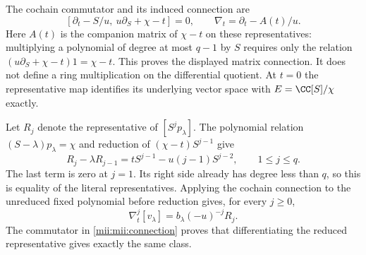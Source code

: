 \documentclass[11pt,a4paper]{article}
\begin{document}
The cochain commutator and its induced connection are
\begin{equation}\tag{MII16}\label{mii:mii:connection}
 [\partial_t-S/u,\ u\partial_S+\chi-t]=0,
 \qquad\nabla_t=\partial_t-A(t)/u.
\end{equation}
Here $A(t)$ is the companion matrix of $\chi-t$ on these
representatives: multiplying a polynomial of degree at most $q-1$
by $S$ requires only the relation
$(u\partial_S+\chi-t)1=\chi-t$. This proves the displayed matrix
connection. It does not define a ring multiplication on the
differential quotient. At $t=0$ the representative map identifies
its underlying vector space with $E=\CC[S]/\chi$ exactly.

Let $R_j$ denote the representative of $[S^j p_\lambda]$. The
polynomial relation $(S-\lambda)p_\lambda=\chi$ and reduction of
$(\chi-t)S^{j-1}$ give
\begin{equation}\tag{MII17}\label{mii:mii:recurrence}
 R_j-\lambda R_{j-1}
       =t S^{j-1}-u(j-1)S^{j-2},\qquad 1\le j\le q.
\end{equation}
The last term is zero at $j=1$. Its right side already has degree
less than $q$, so this is equality of the literal representatives.
Applying the cochain connection to the unreduced fixed polynomial
before reduction gives, for every $j\ge0$,
\begin{equation}\tag{MII18}\label{mii:mii:jets}
 \nabla_t^j[v_\lambda]=b_\lambda(-u)^{-j}R_j.
\end{equation}
The commutator in \eqref{mii:mii:connection} proves that differentiating
the reduced representative gives exactly the same class.
\end{document}
